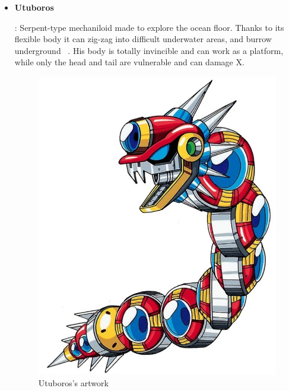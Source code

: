\begin{itemize}
		\item \hypertarget{miniboss:Utuboros}{\textbf{Utuboros}}: Serpent-type mechaniloid made to explore the ocean floor. Thanks to its flexible body it can zig-zag into difficult underwater areas, and burrow underground ~\cite{wayback:X_resources}. His body is totally invincible and can work as a platform, while only the head and tail are vulnerable and can damage X.
		\begin{figure}[htp]
			\centering
			\includegraphics[width=0.5\linewidth]{figures/X1/Enemies/Utuboros.jpg}
			\caption{Utuboros's artwork}
		\end{figure}
	\end{itemize}

